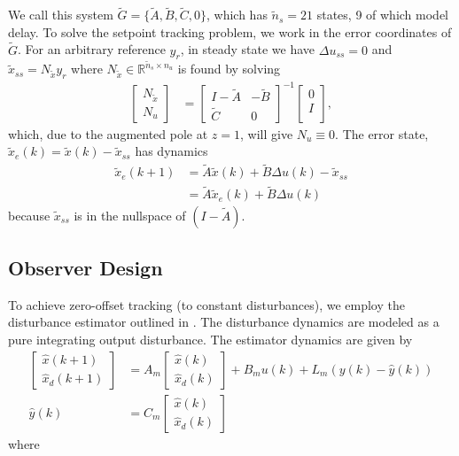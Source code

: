 \documentclass[journal,twocolumn,twoside]{IEEEtran}
\newcommand{\du}{\ensuremath{\Delta u }\xspace}
\newcommand{\Gd}{\ensuremath{\tilde G }\xspace}
\newcommand{\Ad}{\ensuremath{\tilde A }\xspace}
\newcommand{\Bd}{\ensuremath{\tilde B }\xspace}
\newcommand{\Cd}{\ensuremath{\tilde C }\xspace}
\newcommand{\xd}{\ensuremath{\tilde x }\xspace}
\newcommand{\x}{\ensuremath{x }\xspace}
\newcommand{\xdss}{\ensuremath{\tilde x_{ss} }\xspace}
\newcommand{\xde}{\ensuremath{\tilde x_{e} }\xspace}
\newcommand{\y}{\ensuremath{y} \xspace}
\newcommand{\dd}{\ensuremath{\Delta }\xspace}
\begin{document}
We call this system \(\Gd = \{\Ad, \Bd, \Cd, 0\}\), which has \({\tilde{n}_s=21}\) states, 9 of which model delay.
To solve the setpoint tracking problem, we work in the error
coordinates of \(\Gd\).
For an arbitrary reference \(\y_r\), in steady state we have \({\du_{ss}=0}\) and \(\xdss =N_{\xd}\y_r\) where \({N_{\xd}\in\mathds{R}^{\tilde{n}_s\times n_u} }\) is found by solving
\begin{align}
  \begin{bmatrix}N_{\xd} \\ N_u\end{bmatrix} &=
\begin{bmatrix}I-\Ad & -\Bd\\\Cd & 0\end{bmatrix}^{-1}\begin{bmatrix}0\\ I\\\end{bmatrix}\label{eqn:nxnu},
\end{align}
which, due to the augmented pole at $z=1$, will give \(N_u\equiv 0\). 
The error state, \({\xde(k)=\xd(k) - \xdss}\) has dynamics
\begin{align}
  \xde(k+1) & = \Ad\xd(k) + \Bd\dd u(k) - \xdss \nonumber\\
            & = \Ad \xde(k)   + \Bd \dd u(k)\nonumber
\end{align}
              because $\xdss$ is in the nullspace of $(I - \Ad)$.
              
\subsection{Observer Design}\label{sec:dist_est}
To achieve zero-offset tracking (to constant disturbances), we employ the disturbance estimator outlined in \cite{maeder_offset-free_2007}. The disturbance dynamics are modeled as a pure integrating output disturbance. The estimator dynamics are given by
\begin{align}
  \begin{bmatrix} \hat{\x}(k+1)\\ \hat{\x}_d(k+1) \end{bmatrix}
  &= A_m
  \begin{bmatrix} \hat{\x}(k)\\ \hat{\x}_d(k)\end{bmatrix}
    + B_m u(k) + L_m(y(k) - \hat y(k)) \label{eqn:obsdyn}\\
  \hat y(k) &= C_m\begin{bmatrix} \hat{\x}(k)\\
    \hat{\x}_d(k) \end{bmatrix}
\end{align}
              where
              
\end{document}
